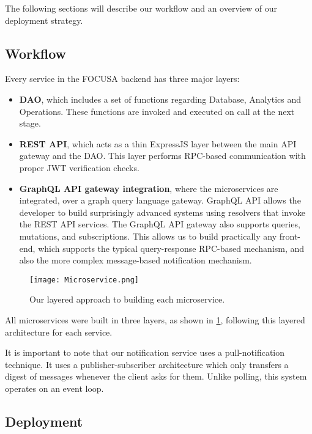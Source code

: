The following sections will describe our workflow and an overview of our deployment strategy.

\subsection{Workflow}

Every service in the FOCUSA backend has three major layers:
\begin{itemize}
    \item \textbf{DAO}, which includes a set of functions regarding Database, Analytics and Operations. 
    These functions are invoked and executed on call at the next stage.
    \item \textbf{REST API}, which acts as a thin ExpressJS layer between the main API gateway and the DAO.
    This layer performs RPC-based communication with proper JWT verification checks.
    \item \textbf{GraphQL API gateway integration}, where the microservices are integrated, over a graph query language gateway.
    GraphQL API allows the developer to build surprisingly advanced systems using resolvers that invoke the REST API services.
    The GraphQL API gateway also supports queries, mutations, and subscriptions. This allows us to build practically any front-end, which supports the typical query-response RPC-based mechanism, and also the more complex message-based notification mechanism.
\end{itemize}

\begin{figure}[h!]
    \begin{center}
        \texttt{[image: Microservice.png]}
    \end{center}
    \caption{Our layered approach to building each microservice.}
    \label{fig:microservice}
\end{figure}

All microservices were built in three layers, as shown in \ref{fig:microservice}, following this layered architecture for each service. 

It is important to note that our notification service uses a pull-notification technique. It uses a 
publisher-subscriber architecture which only transfers a digest of messages whenever the client asks for them. Unlike polling, 
this system operates on an event loop.

\subsection{Deployment}

